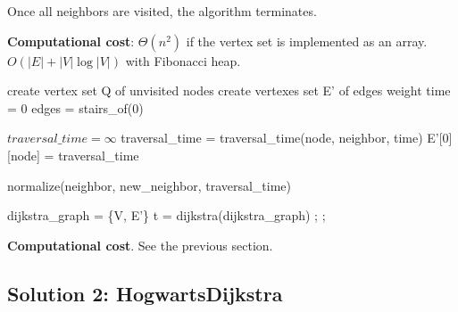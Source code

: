 \documentclass{article}
\begin{document}
Once all neighbors are visited, the algorithm terminates.

\begin{framed}
  \noindent
  \textbf{Computational cost}: $\Theta(n^{2})$ if the vertex set is implemented as an array. $O(|E|+|V|\log |V|)$ with Fibonacci heap.
\end{framed}

\begin{algorithmic}[1]
  \State create vertex set Q of unvisited nodes
  \State create vertexes set E' of edges weight
  \State time = 0                   
  \State edges = stairs\_of(0)      

  \State {}
    \Return{}
  \EndIf

  \State $traversal\_time = \infty$
      \State traversal\_time = traversal\_time(node, neighbor, time)
      \State E'[0][node] = traversal\_time   
      \State {}

      \State normalize(neighbor, new\_neighbor, traversal\_time)
      \EndFor
  \EndFor

  \State dijkstra\_graph = \{V, E'\}
  \State t = dijkstra(dijkstra\_graph)
  \State {} ;
        \Else {};
        \EndIf
  \EndFunction
\end{algorithmic}

\begin{framed}
  \noindent
  \textbf{Computational cost}. See the previous section.
\end{framed}

\subsection{Solution 2: HogwartsDijkstra}
\end{document}
